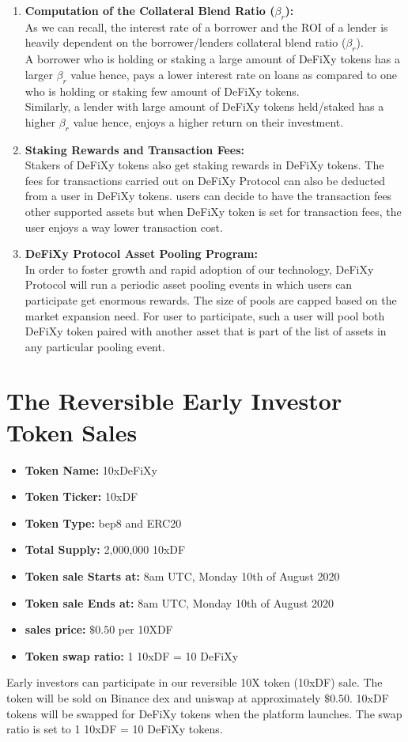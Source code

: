 \documentclass[12pt,onecolumn,letterpaper]{article} %
\begin{document}
\begin{enumerate}
    \item \textbf{Computation of the Collateral Blend Ratio ($\beta_r$):}\\
    As we can recall, the interest rate of a borrower and the ROI of a lender is heavily dependent on the borrower/lenders collateral blend ratio ($\beta_r$).\\
    A borrower who is holding or staking a large amount of DeFiXy tokens has a larger $\beta_r$ value hence, pays a lower interest rate on loans as compared to one who is holding or staking few amount of DeFiXy tokens.\\
    Similarly, a lender with large amount of DeFiXy tokens held/staked has a higher $\beta_r$ value hence, enjoys a higher return on their investment.
    \item \textbf{Staking Rewards and Transaction Fees:}\\
    Stakers of DeFiXy tokens also get staking rewards in DeFiXy tokens. The fees for transactions carried out on DeFiXy Protocol can also be deducted from a user in DeFiXy tokens. users can decide to have the transaction fees other supported assets but when DeFiXy token is set for transaction fees, the user enjoys a way lower transaction cost.
       \item \textbf{DeFiXy Protocol Asset Pooling Program:}\\
In order to foster growth and rapid adoption of our technology, DeFiXy Protocol will run a periodic asset pooling events  in which users can participate get enormous rewards. The size of pools are capped based on the market expansion need. For user to participate, such a user will pool both DeFiXy token paired with another asset that is part of the list of assets in any particular pooling event.
\end{enumerate}
\section{The Reversible Early Investor Token Sales}
\begin{itemize}
    \item \textbf{Token Name:} 10xDeFiXy
    \item \textbf{Token Ticker:} 10xDF
     \item \textbf{Token Type:} bep8 and ERC20
     \item \textbf{Total Supply:} 2,000,000 10xDF
     \item \textbf{Token sale Starts at:} 8am UTC, Monday 10th of August 2020
     \item \textbf{Token sale Ends at:} 8am UTC, Monday 10th of August 2020
     \item \textbf{sales price:} $\$0.50$ per 10XDF
     \item \textbf{Token swap ratio:} 1 10xDF = 10 DeFiXy
    \end{itemize}
Early investors can participate in our reversible 10X token (10xDF) sale. The token will be sold on Binance dex and uniswap at approximately $\$0.50$. 
10xDF tokens will be swapped for DeFiXy tokens when the platform launches. The swap ratio is set to 1 10xDF = 10 DeFiXy tokens.\\
\end{document}
